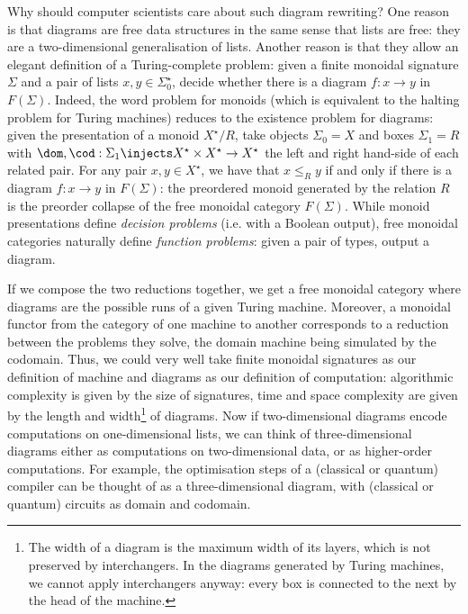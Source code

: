 Why should computer scientists care about such diagram rewriting?
One reason is that diagrams are free data structures in the same sense that lists are free: they are a two-dimensional generalisation of lists.
Another reason is that they allow an elegant definition of a Turing-complete problem: given a finite monoidal signature $\Sigma$ and a pair of lists $x, y \in \Sigma_0^\star$, decide whether there is a diagram $f : x \to y$ in $F(\Sigma)$.
Indeed, the word problem for monoids (which is equivalent to the halting problem for Turing machines) reduces to the existence problem for diagrams: given the presentation of a monoid $X^\star / R$,
take objects $\Sigma_0 = X$ and boxes $\Sigma_1 = R$ with $\dom, \cod : \Sigma_1 \injects X^\star \times X^\star \to X^\star$ the left and right hand-side of each related pair.
For any pair $x, y \in X^\star$, we have that $x \leq_R y$ if and only if there is a diagram $f : x \to y$ in $F(\Sigma)$: the preordered monoid generated by the relation $R$ is the preorder collapse of the free monoidal category $F(\Sigma)$.
While monoid presentations define \emph{decision problems} (i.e. with a Boolean output), free monoidal categories naturally define \emph{function problems}: given a pair of types, output a diagram.

If we compose the two reductions together, we get a free monoidal category where diagrams are the possible runs of a given Turing machine.
Moreover, a monoidal functor from the category of one machine to another corresponds to a reduction between the problems they solve, the domain machine being simulated by the codomain.
Thus, we could very well take finite monoidal signatures as our definition of machine and diagrams as our definition of computation: algorithmic complexity is given by the size of signatures, time and space complexity are given by the length and width\footnote
{The width of a diagram is the maximum width of its layers, which is not preserved by interchangers.
In the diagrams generated by Turing machines, we cannot apply interchangers anyway: every box is connected to the next by the head of the machine.}
of diagrams.
Now if two-dimensional diagrams encode computations on one-dimensional lists, we can think of three-dimensional diagrams either as computations on two-dimensional data, or as higher-order computations.
For example, the optimisation steps of a (classical or quantum) compiler can be thought of as a three-dimensional diagram, with (classical or quantum) circuits as domain and codomain.

